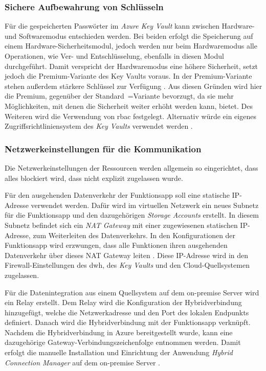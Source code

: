 \subsubsection{Sichere Aufbewahrung von Schlüsseln} \label{subsec:infra:konfig:keyVault}
Für die gespeicherten Passwörter im \textit{Azure Key Vault} kann zwischen Hardware- und Softwaremodus entschieden werden. Bei beiden erfolgt die Speicherung auf einem Hardware-Sicherheitsmodul, jedoch werden nur beim Hardwaremodus alle Operationen, wie Ver- und Entschlüsselung, ebenfalls in diesen Modul durchgeführt. Damit verspricht der Hardwaremodus eine höhere Sicherheit, setzt jedoch die Premium-Variante des Key Vaults voraus. In der Premium-Variante stehen außerdem stärkere Schlüssel zur Verfügung \cite{haunts_key_2019}. Aus diesen Gründen wird hier die Premium, gegenüber der Standard~=Variante bevorzugt, da sie mehr Möglichkeiten, mit denen die Sicherheit weiter erhöht werden kann, bietet. Des Weiteren wird die Verwendung von \ac{rbac} festgelegt. Alternativ würde ein eigenes Zugriffsrichtliniensystem des \textit{Key Vaults} verwendet werden \cite[vgl.][]{herath_azure_2022}.

\subsubsection{Netzwerkeinstellungen für die Kommunikation} \label{subsec:infra:konfig:netzwerk}
Die Netzwerkeinstellungen der Ressourcen werden allgemein so eingerichtet, dass alles blockiert wird, dass nicht explizit zugelassen wurde. 

Für den ausgehenden Datenverkehr der Funktionsapp soll eine statische IP-Adresse verwendet werden. Dafür wird im virtuellen Netzwerk ein neues Subnetz für die Funktionsapp und den dazugehörigen \textit{Storage Accounts} erstellt. In diesem Subnetz befindet sich ein \textit{NAT Gateway} mit einer zugewiesenen statischen IP-Adresse, zum Weiterleiten des Datenverkehrs. In den Konfigurationen der Funktionsapp wird erzwungen, dass alle Funktionen ihren ausgehenden Datenverkehr über dieses NAT Gateway leiten \cite[vgl.][]{msdoc_22_func_ip}. Diese IP-Adresse wird in den Firewall-Einstellungen des \ac{dwh}, des \textit{Key Vaults} und den Cloud-Quellsystemen zugelassen.

Für die Datenintegration aus einem Quellsystem auf dem on-premise Server wird ein Relay erstellt. Dem Relay wird die Konfiguration der Hybridverbindung hinzugefügt, welche die Netzwerkadresse und den Port des lokalen Endpunkts definiert. Danach wird die Hybridverbindung mit der Funktionsapp verknüpft. Nachdem die Hybridverbindung in Azure bereitgestellt wurde, kann eine dazugehörige Gateway-Verbindungszeichenfolge entnommen werden. Damit erfolgt die manuelle Installation und Einrichtung der Anwendung \textit{Hybrid Connection Manager} auf dem on-premise Server \cite[vgl.][]{msdoc_22_func_hybridConn}.

